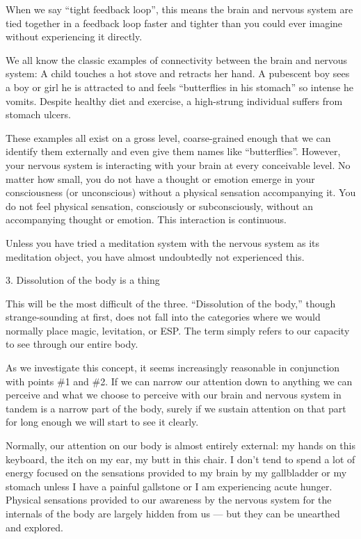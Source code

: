 \documentclass{article}
\begin{document}
When we say ``tight feedback loop'', this means the brain and nervous system are tied together in a feedback loop faster and tighter than you could ever imagine without experiencing it directly.

We all know the classic examples of connectivity between the brain and nervous system: A child touches a hot stove and retracts her hand. A pubescent boy sees a boy or girl he is attracted to and feels ``butterflies in his stomach'' so intense he vomits. Despite healthy diet and exercise, a high-strung individual suffers from stomach ulcers.

These examples all exist on a gross level, coarse-grained enough that we can identify them externally and even give them names like ``butterflies''. However, your nervous system is interacting with your brain at every conceivable level. No matter how small, you do not have a thought or emotion emerge in your consciousness (or unconscious) without a physical sensation accompanying it. You do not feel physical sensation, consciously or subconsciously, without an accompanying thought or emotion. This interaction is continuous.

Unless you have tried a meditation system with the nervous system as its meditation object, you have almost undoubtedly not experienced this.

\vspace{1cm}
\begin{center}
  \LARGE{3. Dissolution of the body is a thing}
\end{center}

This will be the most difficult of the three. ``Dissolution of the body,'' though strange-sounding at first, does not fall into the categories where we would normally place magic, levitation, or ESP. The term simply refers to our capacity to see through our entire body.

As we investigate this concept, it seems increasingly reasonable in conjunction with points \#1 and \#2. If we can narrow our attention down to anything we can perceive and what we choose to perceive with our brain and nervous system in tandem is a narrow part of the body, surely if we sustain attention on that part for long enough we will start to see it clearly.

Normally, our attention on our body is almost entirely external: my hands on this keyboard, the itch on my ear, my butt in this chair. I don't tend to spend a lot of energy focused on the sensations provided to my brain by my gallbladder or my stomach unless I have a painful gallstone or I am experiencing acute hunger. Physical sensations provided to our awareness by the nervous system for the internals of the body are largely hidden from us — but they can be unearthed and explored.
\end{document}
